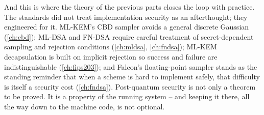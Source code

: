 And this is where the theory of the previous parts closes the loop with practice. The
standards did not treat implementation security as an afterthought; they engineered for
it. ML-KEM's CBD sampler avoids a general discrete Gaussian
(\ref{ch:cbd}); ML-DSA and FN-DSA require careful treatment of secret-dependent
sampling and rejection conditions (\ref{ch:mldsa}, \ref{ch:fndsa}); ML-KEM decapsulation is built on implicit
rejection so success and failure are indistinguishable (\ref{ch:fips203}); and
Falcon's floating-point sampler stands as the standing reminder that when a scheme is
hard to implement safely, that difficulty is itself a security cost (\ref{ch:fndsa}).
Post-quantum security is not only a theorem to be proved. It is a property of the
running system -- and keeping it there, all the way down to the machine code, is not
optional.

\printbibliography[heading=chapterrefs]
